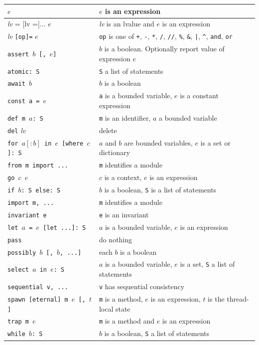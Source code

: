\documentclass{report}
\begin{document}
\vspace{1em}
\begin{tabular}{|l|l|}
\hline
$e$ & $e$ is an expression\\
\hline
\textit{lv} = [lv =]... $e$ & \textit{lv} is an lvalue and $e$ is an expression\\
\hline
\textit{lv} \texttt{[op]=} $e$ & \texttt{op} is one of \texttt{+}, \texttt{-},
\texttt{*}, \texttt{/}, \texttt{//}, \texttt{\%},
\texttt{\&}, \texttt{|}, \texttt{\^},
\texttt{and}, \texttt{or}\\
\hline
\texttt{assert $b$ [, $e$]} & $b$ is a boolean.  Optionally report value of expression $e$\\
\hline
\texttt{atomic: S} & \texttt{S} a list of statements\\
\hline
\texttt{await $b$} & $b$ is a boolean\\
\hline
\texttt{const a = $e$} & \texttt{a} is a bounded variable, $e$ is a constant expression\\
\hline
\texttt{def m $a$: S} & \texttt{m} is an identifier, $a$ a bounded variable\\
\hline
\texttt{del} \textit{lv} & delete\\
\hline
\texttt{for $a[:b]$ in $e$ [where $c$]: S} & $a$ and $b$ are bounded variables, $e$ is a set or dictionary \\
\hline
\texttt{from m import ...} & \texttt{m} identifies a module \\
\hline
\texttt{go $c$ $e$} & $c$ is a context, $e$ is an expression \\
\hline
\texttt{if $b$: S else: S} & $b$ is a boolean, \texttt{S} is a list of statements\\
\hline
\texttt{import m, ...} & \texttt{m} identifies a module \\
\hline
\texttt{invariant e} & \texttt{e} is an invariant\\
\hline
\texttt{let $a$ = $e$ [let ...]: S} & $a$ is a bounded variable, $e$ is an expression\\
\hline
\texttt{pass} & do nothing\\
\hline
\texttt{possibly $b$ [, $b$, ...]} & each $b$ is a boolean \\
\hline
\texttt{select $a$ in $e$: S} & $a$ is a bounded variable, $e$ is a set,
                            \texttt{S} a list of statements\\
\hline
\texttt{sequential v, ...} & \texttt{v} has sequential consistency \\
\hline
\texttt{spawn [eternal] m $e$ [, $t$]} & \texttt{m} is a method,
$e$ is an expression, $t$ is the thread-local state \\
\hline
\texttt{trap m $e$} & \texttt{m} is a method and $e$ is an expression \\
\hline
\texttt{while $b$: S} & $b$ is a boolean, \texttt{S} a list of statements\\
\hline
\end{tabular}
\end{document}
